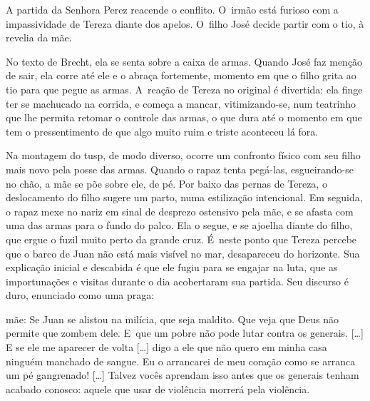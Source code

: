 A partida da Senhora Perez reacende o conflito. O~irmão está furioso com
a impassividade de Tereza diante dos apelos. O~filho José decide partir
com o tio, à revelia da mãe.

No texto de Brecht, ela se senta sobre a caixa de armas. Quando José faz
menção de sair, ela corre até ele e o abraça fortemente, momento em que
o filho grita ao tio para que pegue as armas. A~reação de Tereza no
original é divertida: ela finge ter se machucado na corrida, e começa a
mancar, vitimizando-se, num teatrinho que lhe permita retomar o controle
das armas, o que dura até o momento em que tem o pressentimento de que algo
muito ruim e triste aconteceu lá fora.

Na montagem do {\sc tusp}, de modo diverso, ocorre um confronto físico com seu
filho mais novo pela posse das armas. Quando o rapaz tenta pegá-las,
esgueirando-se no chão, a mãe se põe sobre ele, de pé. Por baixo das
pernas de Tereza, o deslocamento do filho sugere um parto, numa
estilização intencional. Em seguida, o rapaz mexe no nariz em sinal de
desprezo ostensivo pela mãe, e se afasta com uma das armas para o fundo
do palco. Ela o segue, e se ajoelha diante do filho, que ergue o fuzil
muito perto da grande cruz. É~neste ponto que Tereza percebe que o barco
de Juan não está mais visível no mar, desapareceu do horizonte. Sua
explicação inicial e descabida é que ele fugiu para se engajar na luta,
que as importunações e visitas durante o dia acobertaram sua partida.
Seu discurso é duro, enunciado como uma praga:

\startblockquote
{\sc mãe}: Se Juan se alistou na milícia, que seja maldito. Que veja que Deus
não permite que zombem dele. E~que um pobre não pode lutar contra os
generais. {[}\ldots{]} E se ele me aparecer de volta {[}\ldots{]} digo a ele
que não quero em minha casa ninguém manchado de sangue. Eu o arrancarei
de meu coração como se arranca um pé gangrenado! {[}\ldots{]} Talvez vocês
aprendam isso antes que os generais tenham acabado conosco: aquele que
usar de violência morrerá pela violência.
\stopblockquote



